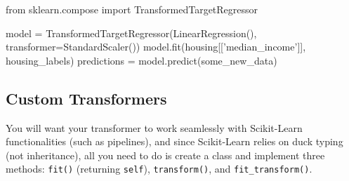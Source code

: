 \begin{pyc}
from sklearn.compose import TransformedTargetRegressor

model = TransformedTargetRegressor(LinearRegression(),
                                    transformer=StandardScaler())
model.fit(housing[['median_income']], housing_labels)
predictions = model.predict(some_new_data)
\end{pyc}
\subsection{Custom Transformers}
You will want your transformer to work seamlessly with Scikit-Learn functionalities (such as pipelines), and since Scikit-Learn relies on duck typing (not inheritance), all you need to do is create a class and implement three methods: \verb|fit()|
(returning \verb|self|), \verb|transform()|, and \verb|fit_transform()|.